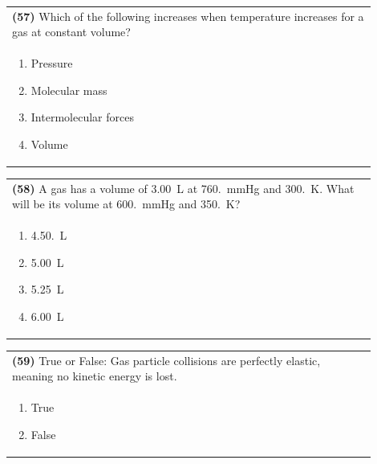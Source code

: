 \documentclass{article}
\begin{document}
\noindent\begin{tabular}{|p{0.9\linewidth}|}
\hline
\textbf{(57)} Which of the following increases when temperature increases for a gas at constant volume?\\[0.2cm]

\begin{minipage}[t]{0.85\linewidth}
\begin{enumerate}[label=\alph*.]
\item Pressure
\item Molecular mass
\item Intermolecular forces
\item Volume
\end{enumerate}
\end{minipage}\\[0.2cm]
\hline
\end{tabular}

\vspace{0.2cm}
\noindent\begin{tabular}{|p{0.9\linewidth}|}
\hline
\textbf{(58)} A gas has a volume of 3.00~L at 760.~mmHg and 300.~K. What will be its volume at 600.~mmHg and 350.~K? \\[0.2cm]

\begin{minipage}[t]{0.85\linewidth}
\begin{enumerate}[label=\alph*.]
\item 4.50.~L
\item 5.00~L
\item 5.25~L
\item 6.00~L
\end{enumerate}
\end{minipage}\\[0.2cm]
\hline
\end{tabular}

\vspace{0.2cm}
\noindent\begin{tabular}{|p{0.9\linewidth}|}
\hline
\textbf{(59)} True or False: Gas particle collisions are perfectly elastic, meaning no kinetic energy is lost.\\[0.2cm]

\begin{minipage}[t]{0.85\linewidth}
\begin{enumerate}[label=\alph*.]
\item True
\item False
\end{enumerate}
\end{minipage}\\[0.2cm]
\hline
\end{tabular}
\end{document}
